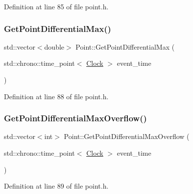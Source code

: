Definition at line 85 of file point.\+h.

\mbox{\label{class_point_a326cd5742e908f8fb3cf6f3275b5462c}} 
\subsubsection{\texorpdfstring{Get\+Point\+Differential\+Max()}{GetPointDifferentialMax()}}
{\footnotesize\ttfamily std\+::vector$<$double$>$ Point\+::\+Get\+Point\+Differential\+Max (\begin{DoxyParamCaption}\item[{std\+::chrono\+::time\+\_\+point$<$ \hyperlink{universe_8h_a0ef8d951d1ca5ab3cfaf7ab4c7a6fd80}{Clock} $>$}]{event\+\_\+time }\end{DoxyParamCaption})\hspace{0.3cm}{\ttfamily [inline]}}



Definition at line 88 of file point.\+h.

\mbox{\label{class_point_a2d38599722fbf65afe2b9ac57b0c4bcf}} 
\subsubsection{\texorpdfstring{Get\+Point\+Differential\+Max\+Overflow()}{GetPointDifferentialMaxOverflow()}}
{\footnotesize\ttfamily std\+::vector$<$int$>$ Point\+::\+Get\+Point\+Differential\+Max\+Overflow (\begin{DoxyParamCaption}\item[{std\+::chrono\+::time\+\_\+point$<$ \hyperlink{universe_8h_a0ef8d951d1ca5ab3cfaf7ab4c7a6fd80}{Clock} $>$}]{event\+\_\+time }\end{DoxyParamCaption})\hspace{0.3cm}{\ttfamily [inline]}}



Definition at line 89 of file point.\+h.

\mbox{\label{class_point_a782860849006b601600f8df15af23f7a}} 
